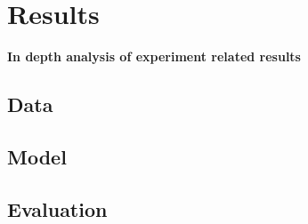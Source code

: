 \documentclass[journal]{IEEEtran}
\begin{document}
\section{Results}
\textbf{In depth analysis of experiment related results}

\subsection{Data}
\subsection{Model}
\subsection{Evaluation}

\end{document}
